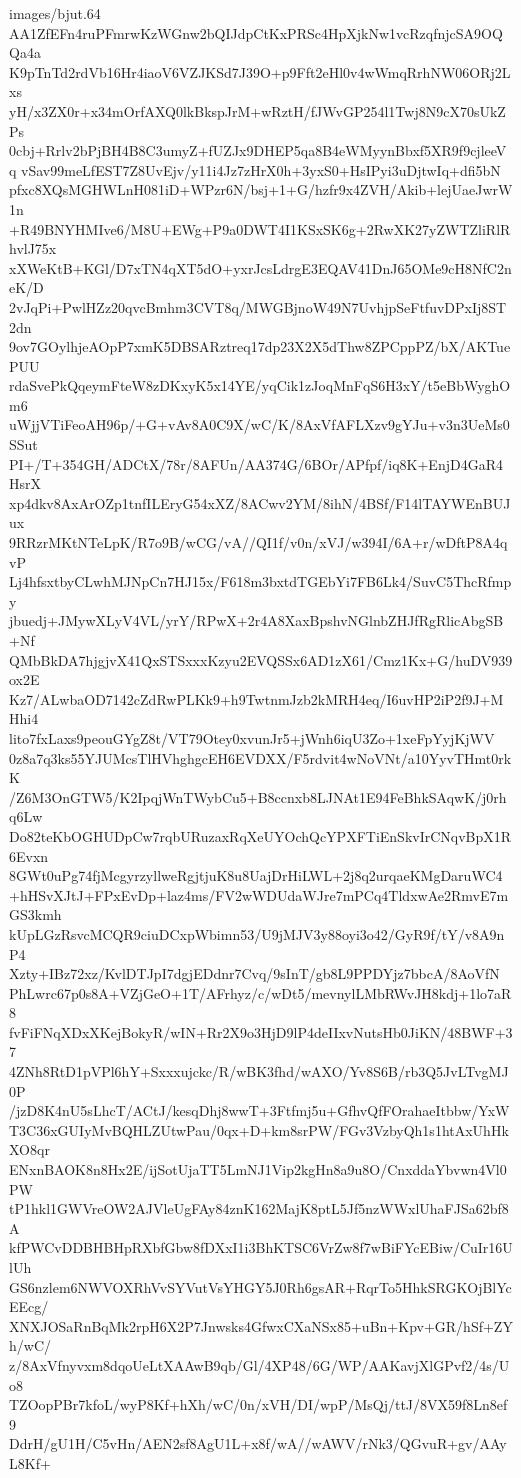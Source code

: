 \begin{filecontents*}{images/bjut.64}
AA1ZfEFn4ruPFmrwKzWGnw2bQIJdpCtKxPRSc4HpXjkNw1vcRzqfnjcSA9OQQa4a
K9pTnTd2rdVb16Hr4iaoV6VZJKSd7J39O+p9Fft2eHl0v4wWmqRrhNW06ORj2Lxs
yH/x3ZX0r+x34mOrfAXQ0lkBkspJrM+wRztH/fJWvGP254l1Twj8N9cX70sUkZPs
0cbj+Rrlv2bPjBH4B8C3umyZ+fUZJx9DHEP5qa8B4eWMyynBbxf5XR9f9cjleeVq
vSav99meLfEST7Z8UvEjv/y11i4Jz7zHrX0h+3yxS0+HsIPyi3uDjtwIq+dfi5bN
pfxc8XQsMGHWLnH081iD+WPzr6N/bsj+1+G/hzfr9x4ZVH/Akib+lejUaeJwrW1n
+R49BNYHMIve6/M8U+EWg+P9a0DWT4I1KSxSK6g+2RwXK27yZWTZliRlRhvlJ75x
xXWeKtB+KGl/D7xTN4qXT5dO+yxrJcsLdrgE3EQAV41DnJ65OMe9cH8NfC2neK/D
2vJqPi+PwlHZz20qvcBmhm3CVT8q/MWGBjnoW49N7UvhjpSeFtfuvDPxIj8ST2dn
9ov7GOylhjeAOpP7xmK5DBSARztreq17dp23X2X5dThw8ZPCppPZ/bX/AKTuePUU
rdaSvePkQqeymFteW8zDKxyK5x14YE/yqCik1zJoqMnFqS6H3xY/t5eBbWyghOm6
uWjjVTiFeoAH96p/+G+vAv8A0C9X/wC/K/8AxVfAFLXzv9gYJu+v3n3UeMs0SSut
PI+/T+354GH/ADCtX/78r/8AFUn/AA374G/6BOr/APfpf/iq8K+EnjD4GaR4HsrX
xp4dkv8AxArOZp1tnfILEryG54xXZ/8ACwv2YM/8ihN/4BSf/F14lTAYWEnBUJux
9RRzrMKtNTeLpK/R7o9B/wCG/vA//QI1f/v0n/xVJ/w394I/6A+r/wDftP8A4qvP
Lj4hfsxtbyCLwhMJNpCn7HJ15x/F618m3bxtdTGEbYi7FB6Lk4/SuvC5ThcRfmpy
jbuedj+JMywXLyV4VL/yrY/RPwX+2r4A8XaxBpshvNGlnbZHJfRgRlicAbgSB+Nf
QMbBkDA7hjgjvX41QxSTSxxxKzyu2EVQSSx6AD1zX61/Cmz1Kx+G/huDV939ox2E
Kz7/ALwbaOD7142cZdRwPLKk9+h9TwtnmJzb2kMRH4eq/I6uvHP2iP2f9J+MHhi4
lito7fxLaxs9peouGYgZ8t/VT79Otey0xvunJr5+jWnh6iqU3Zo+1xeFpYyjKjWV
0z8a7q3ks55YJUMcsTlHVhghgcEH6EVDXX/F5rdvit4wNoVNt/a10YyvTHmt0rkK
/Z6M3OnGTW5/K2IpqjWnTWybCu5+B8ccnxb8LJNAt1E94FeBhkSAqwK/j0rhq6Lw
Do82teKbOGHUDpCw7rqbURuzaxRqXeUYOchQcYPXFTiEnSkvIrCNqvBpX1R6Evxn
8GWt0uPg74fjMcgyrzyllweRgjtjuK8u8UajDrHiLWL+2j8q2urqaeKMgDaruWC4
+hHSvXJtJ+FPxEvDp+laz4ms/FV2wWDUdaWJre7mPCq4TldxwAe2RmvE7mGS3kmh
kUpLGzRsvcMCQR9ciuDCxpWbimn53/U9jMJV3y88oyi3o42/GyR9f/tY/v8A9nP4
Xzty+IBz72xz/KvlDTJpI7dgjEDdnr7Cvq/9sInT/gb8L9PPDYjz7bbcA/8AoVfN
PhLwrc67p0s8A+VZjGeO+1T/AFrhyz/c/wDt5/mevnylLMbRWvJH8kdj+1lo7aR8
fvFiFNqXDxXKejBokyR/wIN+Rr2X9o3HjD9lP4deIIxvNutsHb0JiKN/48BWF+37
4ZNh8RtD1pVPl6hY+Sxxxujckc/R/wBK3fhd/wAXO/Yv8S6B/rb3Q5JvLTvgMJ0P
/jzD8K4nU5sLhcT/ACtJ/kesqDhj8wwT+3Ftfmj5u+GfhvQfFOrahaeItbbw/YxW
T3C36xGUIyMvBQHLZUtwPau/0qx+D+km8srPW/FGv3VzbyQh1s1htAxUhHkXO8qr
ENxnBAOK8n8Hx2E/ijSotUjaTT5LmNJ1Vip2kgHn8a9u8O/CnxddaYbvwn4Vl0PW
tP1hkl1GWVreOW2AJVleUgFAy84znK162MajK8ptL5Jf5nzWWxlUhaFJSa62bf8A
kfPWCvDDBHBHpRXbfGbw8fDXxI1i3BhKTSC6VrZw8f7wBiFYcEBiw/CuIr16UlUh
GS6nzlem6NWVOXRhVvSYVutVsYHGY5J0Rh6gsAR+RqrTo5HhkSRGKOjBlYcEEcg/
XNXJOSaRnBqMk2rpH6X2P7Jnwsks4GfwxCXaNSx85+uBn+Kpv+GR/hSf+ZYh/wC/
z/8AxVfnyvxm8dqoUeLtXAAwB9qb/Gl/4XP48/6G/WP/AAKavjXlGPvf2/4s/Uo8
TZOopPBr7kfoL/wyP8Kf+hXh/wC/0n/xVH/DI/wpP/MsQj/ttJ/8VX59f8Ln8ef9
DdrH/gU1H/C5vHn/AEN2sf8AgU1L+x8f/wA//wAWV/rNk3/QGvuR+gv/AAyL8Kf+

\end{filecontents*}

